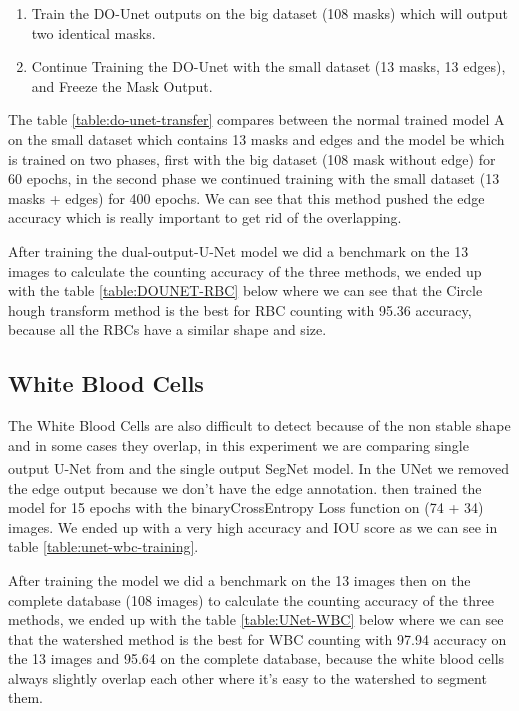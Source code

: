 \begin{enumerate}
    \item Train the DO-Unet outputs on the big dataset (108 masks) which will output two identical masks.
    \item Continue Training the DO-Unet with the small dataset (13 masks, 13 edges), and Freeze the Mask Output.
\end{enumerate}



The table \ref{table:do-unet-transfer} compares between the normal trained model A on the small dataset which contains 13 masks and edges and the model be which is trained on two phases, first with the big dataset (108 mask without edge) for 60 epochs, in the second phase we continued training with the small dataset (13 masks + edges) for 400 epochs.
We can see that this method pushed the edge accuracy which is really important to get rid of the overlapping.

After training the dual-output-U-Net model we did a benchmark on the 13 images to calculate the counting accuracy of the three methods, we ended up with the table \ref{table:DOUNET-RBC} below where we can see that the Circle hough transform method is the best for RBC counting with 95.36 accuracy, because all the RBCs have a similar shape and size.



\subsection{White Blood Cells}
The White Blood Cells are also difficult to detect because of the non stable shape and in some cases they overlap, in this experiment we are comparing single output U-Net from \textsuperscript{\cite{10.1007/978-3-030-44584-3_31}} and the single output SegNet model.
In the UNet we removed the edge output because we don't have the edge annotation. then trained the model for 15 epochs with the binaryCrossEntropy Loss function on (74 + 34) images. 
We ended up with a very high accuracy and IOU score as we can see in table \ref{table:unet-wbc-training}.



After training the model we did a benchmark on the 13 images then on the complete database (108 images) to calculate the counting accuracy of the three methods, we ended up with the table \ref{table:UNet-WBC} below where we can see that the watershed method is the best for WBC counting with 97.94 accuracy on the 13 images and 95.64 on the complete database, because the white blood cells always slightly overlap each other where it's easy to the watershed to segment them.

